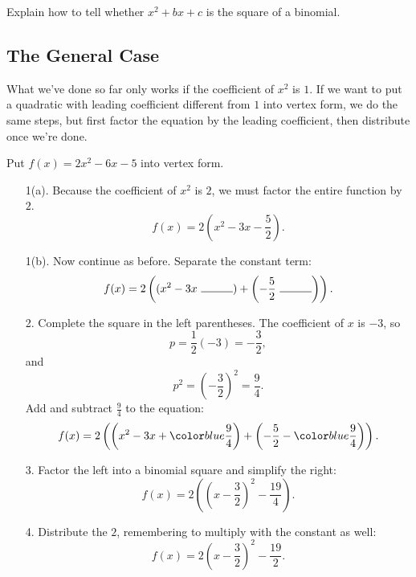 \documentclass{ximera}
\begin{document}
\begin{callout}
Explain how to tell whether $x^2 + bx + c$ is the square of a binomial.
\end{callout}
   
\subsection{The General Case}
   
What we've done so far only works if the coefficient of $x^2$ is $1$. If we want to put a quadratic with leading coefficient different from $1$ into vertex form, we do the same steps, but first factor the equation by the leading coefficient, then distribute once we're done.

\begin{example} 
Put $f(x) = 2x^2 - 6x - 5$ into vertex form.
\begin{explanation}
\begin{enumerate}
    \item[1(a).] Because the coefficient of $x^2$ is $2$, we must factor the entire function by $2$.
    $$
    f(x) = 2 \left(x^2 - 3x - \frac{5}{2} \right).
    $$
    \item[1(b).] Now continue as before. Separate the constant term:
    $$
        f(x) = 2\left((x^2 - 3x\ \rule{1cm}{0.15mm}) + \left(-\frac{5}{2}\ \rule{1cm}{0.15mm}\right)\right).
    $$
    \item[2.] Complete the square in the left parentheses. The coefficient of $x$ is $-3$, so
    $$
        p = \frac{1}{2}(-3) = -\frac{3}{2},
    $$
    and
    $$
        p^2 = \left(-\frac{3}{2}\right)^2 = \frac{9}{4}.
    $$
    Add and subtract $\frac{9}{4}$ to the equation:
    $$
        f(x) = 2\left(\left(x^2 - 3x +\substitute{\frac{9}{4}}\right) + \left(-\frac{5}{2} -\substitute{\frac{9}{4}}\right)\right).
    $$
    \item[3.] Factor the left into a binomial square and simplify the right:
    $$
        f(x) =2 \left(\left(x-\frac{3}{2}\right)^2 - \frac{19}{4}\right).
    $$
    \item[4.] Distribute the $2$, remembering to multiply with the constant as well:
    $$
        f(x) =2 \left(x-\frac{3}{2}\right)^2 - \frac{19}{2}.
    $$
\end{enumerate}
\end{explanation}
\end{example}
\end{document}
